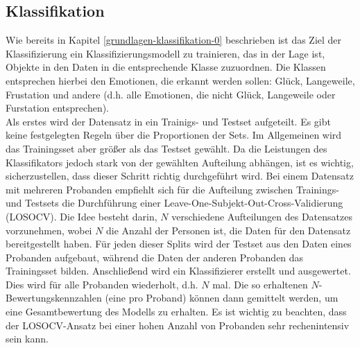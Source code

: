 \subsection{Klassifikation} \label{klassifikation-1}

Wie bereits in Kapitel \ref{grundlagen-klassifikation-0} beschrieben ist das Ziel der Klassifizierung ein Klassifizierungsmodell zu trainieren, das in der Lage ist, Objekte in den Daten in die entsprechende Klasse zuzuordnen. Die Klassen entsprechen hierbei den Emotionen, die erkannt werden sollen: Gl{\"u}ck, Langeweile, Frustation und andere (d.h. alle Emotionen, die nicht Gl{\"u}ck, Langeweile oder Furstation entsprechen). \\

Als erstes wird der Datensatz in ein Trainigs- und Testset  aufgeteilt. 
Es gibt keine festgelegten Regeln {\"u}ber die Proportionen der Sets. 
Im Allgemeinen wird das Trainingsset aber gr{\"o}{\ss}er als das Testset gew{\"a}hlt.
Da die Leistungen des Klassifikators jedoch stark von der gew{\"a}hlten Aufteilung abh{\"a}ngen, ist es wichtig, sicherzustellen, dass dieser Schritt richtig durchgef{\"u}hrt wird.
Bei einem Datensatz mit mehreren Probanden empfiehlt sich f{\"u}r die Aufteilung zwischen Trainings- und Testsets die Durchf{\"u}hrung einer Leave-One-Subjekt-Out-Cross-Validierung (LOSOCV).
Die Idee besteht darin, $N$ verschiedene Aufteilungen des Datensatzes vorzunehmen, wobei $N$ die Anzahl der Personen ist, die Daten f{\"u}r den Datensatz bereitgestellt haben. 
F{\"u}r jeden dieser Splits wird der Testset aus den Daten eines Probanden aufgebaut, w{\"a}hrend die Daten der anderen Probanden das Trainingsset bilden. 
Anschlie{\ss}end wird ein Klassifizierer erstellt und ausgewertet. Dies wird f{\"u}r alle Probanden wiederholt, d.h. $N$ mal.
Die so erhaltenen $N$-Bewertungskennzahlen (eine pro Proband) k{\"o}nnen dann gemittelt werden, um eine Gesamtbewertung des Modells zu erhalten.
Es ist wichtig zu beachten, dass der LOSOCV-Ansatz bei einer hohen Anzahl von Probanden sehr rechenintensiv sein kann. \\

\begin{figure}[h] 
\label{fig:losocv} \end{figure} \vspace{0.5cm}
